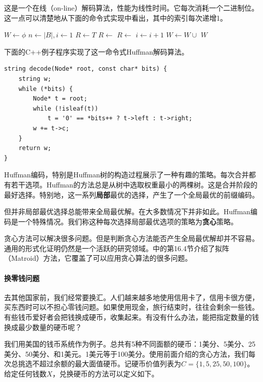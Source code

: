 \documentclass[b5paper]{ctexart}
\begin{document}
这是一个在线（on-line）解码算法，性能为线性时间。它每次消耗一个二进制位。这一点可以清楚地从下面的命令式实现中看出，其中的索引每次递增1。

\begin{algorithmic}[1]
  \State $W \gets \phi$
  \State $n \gets |B|, i \gets 1$
    \State $R \gets T$
        \State $R \gets$ 
      \Else
        \State $R \gets$ 
      \EndIf
      \State $i \gets i + 1$
    \EndWhile
    \State $W \gets W \cup$ 
  \EndWhile
  \State \Return $W$
\EndFunction
\end{algorithmic}

下面的C++例子程序实现了这一命令式Huffman解码算法。

\lstset{language=C++}
\begin{lstlisting}
string decode(Node* root, const char* bits) {
    string w;
    while (*bits) {
        Node* t = root;
        while (!isleaf(t))
            t = '0' == *bits++ ? t->left : t->right;
        w += t->c;
    }
    return w;
}
\end{lstlisting}

Huffman编码，特别是Huffman树的构造过程展示了一种有趣的策略。每次合并都有若干选项。Huffman的方法总是从树中选取权重最小的两棵树。这是合并阶段的最好选择。特别地，这一系列\textbf{局部}最优的选择，产生了一个全局最优的前缀编码。

但并非局部最优选择总能带来全局最优解。在大多数情况下并非如此。Huffman编码是一个特殊情况。我们称这种每次选择局部最优选项的策略为\textbf{贪心}策略。

贪心方法可以解决很多问题。但是判断贪心方法能否产生全局最优解却并不容易。通用的形式化证明仍然是一个活跃的研究领域。\cite{CLRS}中的第16.4节介绍了拟阵（Matroid）方法，它覆盖了可以应用贪心算法的很多问题。

\paragraph{换零钱问题}

去其他国家前，我们经常要换汇。人们越来越多地使用信用卡了，信用卡很方便，买东西时可以不担心零钱问题。如果使用现金，旅行结束时，往往会剩余一些钱。有些钱币爱好者会把钱换成硬币，收集起来。有没有什么办法，能把指定数量的钱换成最少数量的硬币呢？

我们用美国的钱币系统作为例子。总共有5种不同面额的硬币：1美分、5美分、25美分、50美分、和1美元。1美元等于100美分。使用前面介绍的贪心方法，我们每次总挑选不超过余额的最大面值硬币。记硬币价值列表为$C = \{1, 5, 25, 50, 100\}$。给定任何钱数$X$，兑换硬币的方法可以定义如下。
\end{document}

